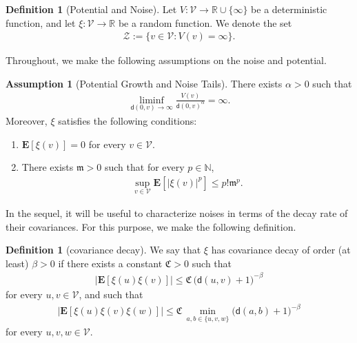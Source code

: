 \documentclass{amsart}
\numberwithin{equation}{section}
\theoremstyle{definition}
\newtheorem{assumption}[theorem]{Assumption}
\newtheorem{definition}[theorem]{Definition}
\newcommand\al{\alpha}
\newcommand\be{\beta}
\newcommand\mbb{\mathbb}
\newcommand\mbf{\mathbf}
\newcommand\mf{\mathfrak}
\newcommand\ms{\mathscr}
\newcommand\msf{\mathsf}
\begin{document}
%

\begin{definition}[Potential and Noise]
Let $V:\ms V\to\mbb R\cup\{\infty\}$ be a deterministic function,
and let $\xi:\ms V\to\mbb R$ be a random function.
We denote the set
\begin{align}
\label{Equation: Dirichlet Set}
\ms Z:=\{v\in\ms V:V(v)=\infty\}.
\end{align}
\end{definition}

%

Throughout, we make the following assumptions on the noise and potential.

%

\begin{assumption}[Potential Growth and Noise Tails]
\label{Assumption: Potential and Noise}
There exists $\al>0$ such that
\begin{align}
\label{Equation: Potential Growth}
\liminf_{\msf d(0,v)\to\infty}\frac{V(v)}{\msf d(0,v)^\al}=\infty.
\end{align}
Moreover, $\xi$ satisfies the following conditions:
\begin{enumerate}
\item $\mbf E[\xi(v)]=0$ for every $v\in\ms V$.
\item There exists $\mf m>0$ such that
for every $p\in\mbb N$,
\begin{align}
\label{Equation: Exponential Moments}
\sup_{v\in\ms V}\mbf E[|\xi(v)|^p]\leq p!\mf m^p.
\end{align}
\end{enumerate}
\end{assumption}

%

In the sequel, it will be useful to characterize noises in terms
of the decay rate of their covariances. For this purpose, we make
the following definition.

%

\begin{definition}[covariance decay]
\label{Definition: covariance decay}
We say that $\xi$ has covariance decay of order (at least) $\be>0$ if there
exists a constant $\mf C>0$ such that
\begin{align}
\label{Equation: covariance decay of Order Two}
\big|\mbf E[\xi(u)\xi(v)]\big|\leq\mf C\,\big(\msf d(u,v)+1\big)^{-\be}
\end{align}
for every $u,v\in\ms V$, and such that
\begin{align}
\label{Equation: covariance decay of Order Three}
\big|\mbf E[\xi(u)\xi(v)\xi(w)]\big|\leq\mf C\,\min_{a,b\in\{u,v,w\}}\big(\msf d(a,b)+1\big)^{-\be}
\end{align}
for every $u,v,w\in\ms V$.
\end{definition}
\end{document}
